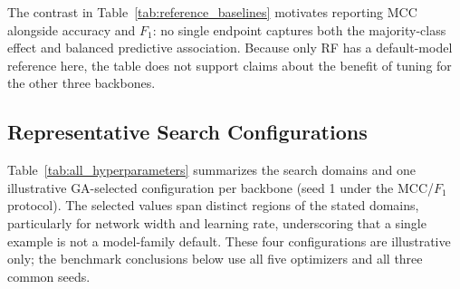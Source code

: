 The contrast in Table~\ref{tab:reference_baselines} motivates reporting MCC alongside accuracy and $F_1$: no single endpoint captures both the majority-class effect and balanced predictive association. Because only RF has a default-model reference here, the table does not support claims about the benefit of tuning for the other three backbones.

\subsection{Representative Search Configurations}
\label{sec:performance_models}

Table~\ref{tab:all_hyperparameters} summarizes the search domains and one illustrative GA-selected configuration per backbone (seed 1 under the MCC/$F_1$ protocol). The selected values span distinct regions of the stated domains, particularly for network width and learning rate, underscoring that a single example is not a model-family default. These four configurations are illustrative only; the benchmark conclusions below use all five optimizers and all three common seeds.

